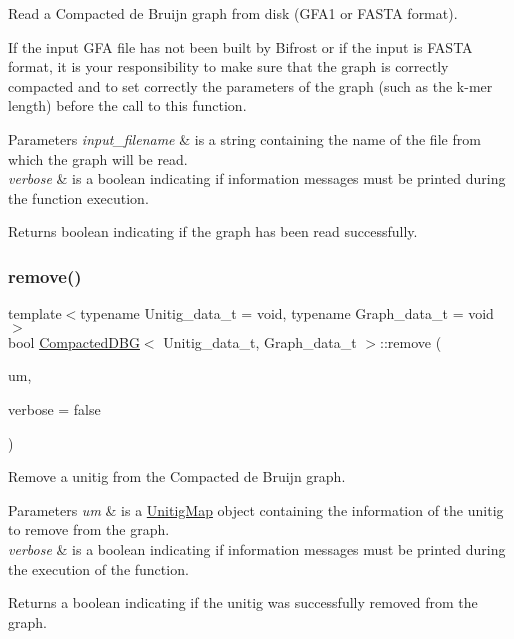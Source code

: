 Read a Compacted de Bruijn graph from disk (G\+F\+A1 or F\+A\+S\+TA format). 

If the input G\+FA file has not been built by Bifrost or if the input is F\+A\+S\+TA format, it is your responsibility to make sure that the graph is correctly compacted and to set correctly the parameters of the graph (such as the k-\/mer length) before the call to this function. 
\begin{DoxyParams}{Parameters}
{\em input\+\_\+filename} & is a string containing the name of the file from which the graph will be read. \\
\hline
{\em verbose} & is a boolean indicating if information messages must be printed during the function execution. \\
\hline
\end{DoxyParams}
\begin{DoxyReturn}{Returns}
boolean indicating if the graph has been read successfully. 
\end{DoxyReturn}
\mbox{\label{classCompactedDBG_aa8e901dc6f1cf0adcc91608a6b34e999}} 
\subsubsection{\texorpdfstring{remove()}{remove()}}
{\footnotesize\ttfamily template$<$typename Unitig\+\_\+data\+\_\+t = void, typename Graph\+\_\+data\+\_\+t = void$>$ \\
bool \hyperlink{classCompactedDBG}{Compacted\+D\+BG}$<$ Unitig\+\_\+data\+\_\+t, Graph\+\_\+data\+\_\+t $>$\+::remove (\begin{DoxyParamCaption}\item[{const \hyperlink{CompactedDBG_8hpp_a631369597e56604279ba89a211c14fd0}{const\+\_\+\+Unitig\+Map}$<$ U, G $>$ \&}]{um,  }\item[{const bool}]{verbose = {\ttfamily false} }\end{DoxyParamCaption})}



Remove a unitig from the Compacted de Bruijn graph. 


\begin{DoxyParams}{Parameters}
{\em um} & is a \hyperlink{classUnitigMap}{Unitig\+Map} object containing the information of the unitig to remove from the graph. \\
\hline
{\em verbose} & is a boolean indicating if information messages must be printed during the execution of the function. \\
\hline
\end{DoxyParams}
\begin{DoxyReturn}{Returns}
a boolean indicating if the unitig was successfully removed from the graph. 
\end{DoxyReturn}
\mbox{\label{classCompactedDBG_af27c7bcb26d05371bdcc12075b4724eb}} 
